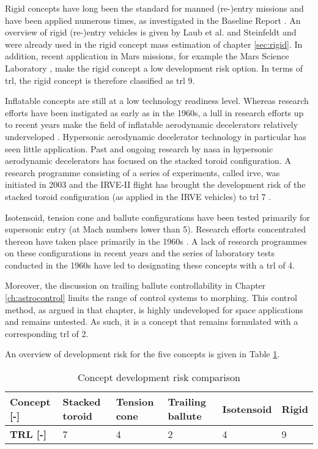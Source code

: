 Rigid concepts have long been the standard for manned (re-)entry missions and have been applied numerous times, as investigated in the Baseline Report \cite[p.2-3]{Balasooriyan2015a}. An overview of rigid (re-)entry vehicles is given by Laub et al. \cite{Laub2004} and Steinfeldt \cite{Steinfeldt2009} and were already used in the rigid concept mass estimation of chapter \ref{sec:rigid}. In addition, recent application in Mars missions, for example the Mars Science Laboratory \cite{Schoenenberger2009}, make the rigid concept a low development risk option. In terms of \gls{trl}, the rigid concept is therefore classified as \gls{trl} 9.

Inflatable concepts are still at a low technology readiness level. Whereas research efforts have been instigated as early as in the 1960s, a lull in research efforts up to recent years make the field of inflatable aerodynamic decelerators relatively underveloped \cite{Smith2010}. Hypersonic aerodynamic decelerator technology in particular has seen little application. Past and ongoing research by \gls{nasa} in hypersonic aerodynamic decelerators has focused on the stacked toroid configuration. A research programme consisting of a series of experiments, called \acrfull{irve}, was initiated in 2003 and the IRVE-II flight has brought the development risk of the stacked toroid configuration (as applied in the IRVE vehicles) to \gls{trl} 7 \cite{Player2005}.

Isotensoid, tension cone and ballute configurations have been tested primarily for supersonic entry (at Mach numbers lower than 5). Research efforts concentrated thereon have taken place primarily in the 1960s \cite{Smith2010}. A lack of research programmes on these configurations in recent years and the series of laboratory tests conducted in the 1960s have led to designating these concepts with a \gls{trl} of 4.

Moreover, the discussion on trailing ballute controllability in Chapter \ref{ch:astrocontrol} limits the range of control systems to morphing. This control method, as argued in that chapter, is highly undeveloped for space applications and remains untested. As such, it is a concept that remains formulated with a corresponding \gls{trl} of 2.

An overview of development risk for the five concepts is given in Table \ref{tab:concrisk}.

\begin{table}[h]
\caption{Concept development risk comparison}
\begin{tabular}{|l|l|l|l|l|l|}
\hline
\textbf{Concept {[}-{]}} & Stacked toroid & Tension cone & Trailing ballute & Isotensoid & Rigid \\ \hline
\textbf{TRL {[}-{]}}     & 7              & 4            & 2                & 4          & 9     \\ \hline
\end{tabular}
\label{tab:concrisk}
\end{table}

